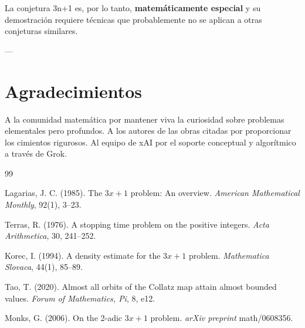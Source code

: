 \documentclass[11pt,a4paper]{article}
\begin{document}
La conjetura 3n+1 es, por lo tanto, \textbf{matemáticamente especial} y su demostración requiere técnicas que probablemente no se aplican a otras conjeturas similares.

---

\section*{Agradecimientos}
A la comunidad matemática por mantener viva la curiosidad sobre problemas elementales pero profundos. A los autores de las obras citadas por proporcionar los cimientos rigurosos. Al equipo de xAI por el soporte conceptual y algorítmico a través de Grok.

\begin{thebibliography}{99}
\setlength{\itemsep}{0.5em}

Lagarias, J. C. (1985).
The \( 3x + 1 \) problem: An overview.
\textit{American Mathematical Monthly}, 92(1), 3--23.

Terras, R. (1976).
A stopping time problem on the positive integers.
\textit{Acta Arithmetica}, 30, 241--252.

Korec, I. (1994).
A density estimate for the \( 3x+1 \) problem.
\textit{Mathematica Slovaca}, 44(1), 85--89.

Tao, T. (2020).
Almost all orbits of the Collatz map attain almost bounded values.
\textit{Forum of Mathematics, Pi}, 8, e12.

Monks, G. (2006).
On the 2-adic \( 3x+1 \) problem.
\textit{arXiv preprint} math/0608356.

\end{thebibliography}
\end{document}
